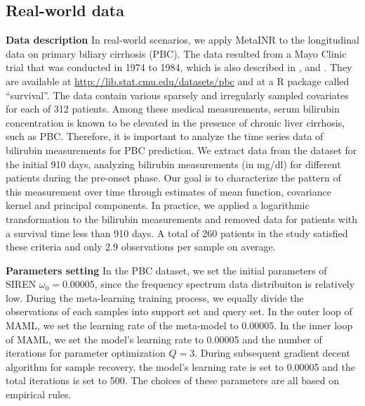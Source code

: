 \documentclass{article}
\begin{document}
\subsection{Real-world data}
\textbf{Data description} 
In real-world scenarios, we apply MetaINR to the longitudinal data on primary biliary cirrhosis (PBC).
The data resulted from a Mayo Clinic trial that was conducted in 1974 to 1984, 
which is also described in \cite{markus1989efficacy}, \cite{fleming2013counting} and \cite{murtaugh1994primary}. 
They are available at \url{http://lib.stat.cmu.edu/datasets/pbc} and at a R package called ``survival''.
The data contain various sparsely and irregularly sampled covariates for each of 312 patients. 
Among these medical measurements,
serum bilirubin concentration is known to be elevated in the presence of chronic liver cirrhosis, such as PBC.
Therefore, it is important to analyze the time series data of bilirubin measurements for PBC prediction.
We extract data from the dataset for the initial 910 days, 
analyzing bilirubin measurements (in mg/dl) for different patients 
during the pre-onset phase. 
Our goal is to characterize the pattern of this measurement over time through estimates of mean function, covariance kernel and principal components.
In practice, we applied a logarithmic transformation to the bilirubin measurements and removed data for patients with a survival time less than 910 days.
A total of 260 patients in the study satisfied these criteria and only 2.9 observations per sample on average. 

\textbf{Parameters setting} 
In the PBC dataset, we set the initial parameters of SIREN $\omega_0=0.00005$, since the frequency spectrum data distribuiton is relatively low.
During the meta-learning training process, we equally divide the observations of each samples into support set and query set.
In the outer loop of MAML, we set the learning rate of the meta-model to 0.00005. 
In the inner loop of MAML, we set the model's learning rate to 0.00005 and the number of iterations for parameter optimization $Q=3$.
During subsequent gradient decent algorithm for sample recovery, the model's learning rate is set to 0.00005 and the total iterations is set to 500.
The choices of these parameters are all based on empirical rules.
\end{document}
